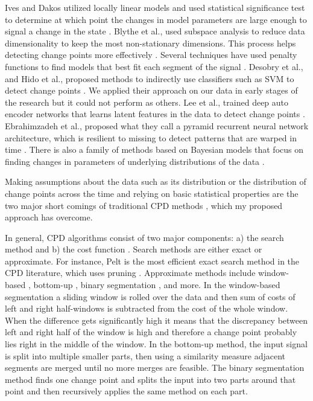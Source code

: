 Ives and Dakos utilized locally linear models and used statistical significance test to determine at which point the changes in model parameters are large enough to signal a change in the state \cite{Ives2012}. Blythe et al., used subspace analysis to reduce data dimensionality to keep the most non-stationary dimensions. This process helps detecting change points more effectively \cite{Blythe2012}.
Several techniques have used penalty functions to find models that best fit each segment of the signal \cite{Lavielle1999, lavielle2005using, keshavarz2018optimal, pein2017heterogeneous, khan2019deep}. 
Desobry et al., and Hido et al., proposed methods to indirectly use classifiers such as SVM to detect change points \cite{desobry2005online, hido2008unsupervised, Khan2019thesis}. We applied their approach on our data in early stages of the research but it could not perform as others.
Lee et al., trained deep auto encoder networks that learns latent features in the data to detect change points \cite{Lee2018TimeSeriesSegmentation}. Ebrahimzadeh et al., proposed what they call a pyramid recurrent neural network architecture, which is resilient to missing to detect patterns that are warped in time \cite{Ebrahimzadeh2019}.
There is also a family of methods based on Bayesian models that focus on finding changes in parameters of underlying distributions of the data \cite{Lee2018TimeSeriesSegmentation, adams2007bayesian, bai1997estimation, barry1993bayesian, erdman2008fast, ray2002bayesian}. 

Making assumptions about the data such as its distribution or the distribution of change points across the time and relying on basic statistical properties are the two major short comings of traditional CPD methods \cite{Lee2018TimeSeriesSegmentation}, which my proposed approach has overcome.


In general, CPD algorithms consist of two major components: a) the search method and b) the cost function \cite{Truong2018ChangePointSurvey}.
Search methods are either exact or approximate. For instance, Pelt is the most efficient exact search method in the CPD literature, which uses pruning \cite{killick2012optimal}. Approximate methods include window-based \cite{basseville1993detection}, bottom-up \cite{keogh2001online}, binary segmentation \cite{scott1974cluster}, and more. In the window-based segmentation a sliding window is rolled over the data and then sum of costs of left and right half-windows is subtracted from the cost of the whole window. When the difference gets significantly high it means that the discrepancy between left and right half of the window is high and therefore a change point probably lies right in the middle of the window. In the bottom-up method, the input signal is split into multiple smaller parts, then using a similarity measure adjacent segments are merged until no more merges are feasible. The binary segmentation method finds one change point and splits the input into two parts around that point and then recursively applies the same method on each part.

